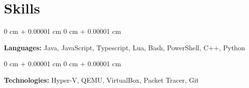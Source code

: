\documentclass[10pt, letterpaper]{article}
\newenvironment{onecolentry}{
    \begin{adjustwidth}{
        0 cm + 0.00001 cm
    }{
        0 cm + 0.00001 cm
    }
}{
    \end{adjustwidth}
} %
\begin{document}
    
    \section{Skills}



        
        \begin{onecolentry}
            \textbf{Languages:} Java, JavaScript, Typescript, Lua, Bash, PowerShell, C++, Python
        \end{onecolentry}

        \vspace{0.2 cm}

        \begin{onecolentry}
            \textbf{Technologies:} Hyper-V, QEMU, VirtualBox, Packet Tracer, Git 
        \end{onecolentry}


    
\end{document}
